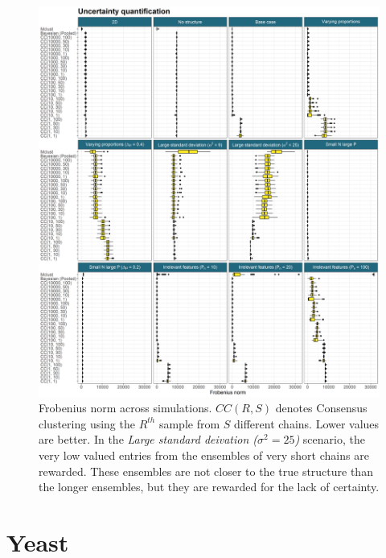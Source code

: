 \documentclass[]{article}
\begin{document}
\begin{figure} %
	\centering
	\includegraphics[scale=0.4]{./Images/Simulations/simulation_uncertainty.png}
	\caption{Frobenius norm across simulations. $CC(R, S)$ denotes Consensus clustering using the $R^{th}$ sample from $S$ different chains. Lower values are better. In the \emph{Large standard deivation ($\sigma^2 = 25$)} scenario, the very low valued entries from the ensembles of very short chains are rewarded. These ensembles are not closer to the true structure than the longer ensembles, but they are rewarded for the lack of certainty.}
	\label{fig:simUncertainty}
\end{figure}

\section{Yeast} \label{sec:yeast}
\end{document}
